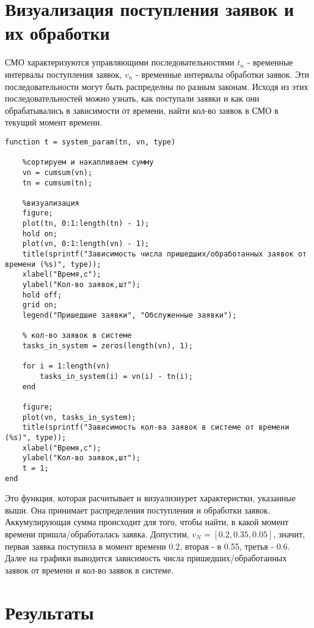 \section*{\textbf{Визуализация поступления заявок и их обработки}}

СМО характеризуются управляющими последовательностями $t_n$ - временные интервалы поступления заявок, $v_n$ - временные интервалы
обработки заявок. Эти последовательности могут быть распределны по разным законам. Исходя из этих последовательностей можно узнать,
как поступали заявки и как они обрабатывались в зависимости от времени, найти кол-во заявок в СМО в текущий момент времени.

\begin{lstlisting}
function t = system_param(tn, vn, type)
    
    %сортируем и накапливаем сумму
    vn = cumsum(vn);
    tn = cumsum(tn);
    
    %визуализация
    figure;
    plot(tn, 0:1:length(tn) - 1);
    hold on;
    plot(vn, 0:1:length(vn) - 1);
    title(sprintf("Зависимость числа пришедших/обработанных заявок от времени (%s)", type));
    xlabel("Время,с");
    ylabel("Кол-во заявок,шт");
    hold off;
    grid on;
    legend("Пришедшие заявки", "Обслуженные заявки");
    
    % кол-во заявок в системе
    tasks_in_system = zeros(length(vn), 1);
    
    for i = 1:length(vn)
        tasks_in_system(i) = vn(i) - tn(i); 
    end
    
    figure;
    plot(vn, tasks_in_system);
    title(sprintf("Зависимость кол-ва заявок в системе от времени (%s)", type));
    xlabel("Время,с");
    ylabel("Кол-во заявок,шт");
    t = 1;
end

\end{lstlisting}

Это функция, которая расчитывает и визуализиурет характеристки, указанные выши. Она принимает распределения поступления и обработки
заявок. Аккумулирующая сумма происходит для того, чтобы найти, в какой момент времени пришла/обработалась заявка. Допустим,  $v_N
= [0.2, 0.35, 0.05]$, значит, первая заявка поступила в момент времени 0.2, вторая - в 0.55, третья - 0.6. Далее на графики
выводится зависимость числа пришедших/обработанных заявок от времени и кол-во заявок в системе.


\section*{\textbf{Результаты}}

